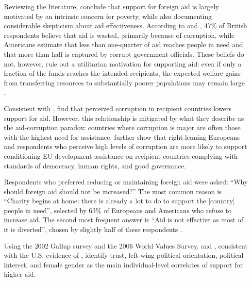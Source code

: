\documentclass[11pt,a4paper]{article}
\begin{document}
Reviewing the literature, \citet{hudson_mile_2012} conclude that support for foreign aid is largely motivated by an intrinsic concern for poverty, while also documenting considerable skepticism about aid effectiveness. According to \citet{dfid_aid_2009} and \citet{PIPA2001}, 47\% of British respondents believe that aid is wasted, primarily because of corruption, while Americans estimate that less than one-quarter of aid reaches people in need and that more than half is captured by corrupt government officials. These beliefs do not, however, rule out a utilitarian motivation for supporting aid: even if only a fraction of the funds reaches the intended recipients, the expected welfare gains from transferring resources to substantially poorer populations may remain large \citep{kopczuk_limitations_2005}.

Consistent with \citet{henson_public_2010}, \citet{bauhr_corruption_2013} find that perceived corruption in recipient countries lowers support for aid. However, this relationship is mitigated by what they describe as the aid-corruption paradox: countries where corruption is major are often those with the highest need for assistance. \citet{bodenstein_who_2017} further show that right-leaning Europeans and respondents who perceive high levels of corruption are more likely to support conditioning EU development assistance on recipient countries complying with standards of democracy, human rights, and good governance.

Respondents who preferred reducing or maintaining foreign aid were asked: ``Why should foreign aid should not be increased?'' The most common reason is ``Charity begins at home: there is already a lot to do to support the [country] people in need'', selected by 63\% of Europeans and Americans who refuse to increase aid. The second most frequent answer is ``Aid is not effective as most of it is diverted'', chosen by slightly half of these respondents %
\citep[Figures 7, S25]{fabre_majority_2025}.

Using the 2002 Gallup survey and the 2006 World Values Survey, \citet{bayram_aiding_2017} and \citet{paxton_individual_2012}, consistent with the U.S. evidence of \citet{heinrich_voters_2018}, identify trust, left-wing political orientation, political interest, and female gender as the main individual-level correlates of support for higher aid.
\end{document}
